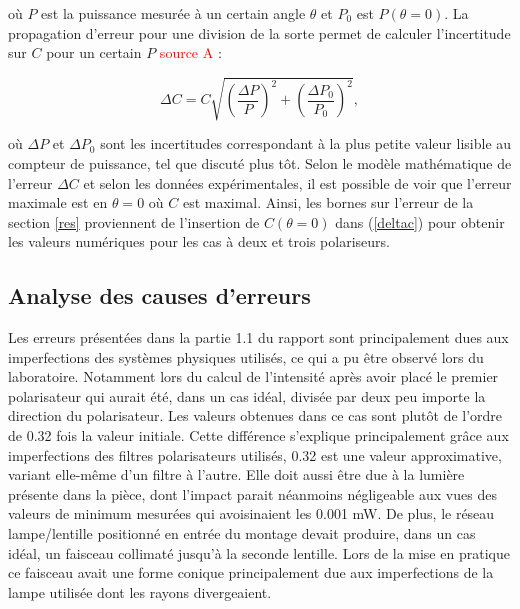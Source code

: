 \documentclass[11pt,letterpaper]{article}
\begin{document}
où $P$ est la puissance mesurée à un certain angle $\theta$ et $P_{0}$ est $P\left( \theta= 0 \right)$.
La propagation d'erreur pour une division de la sorte permet de calculer l'incertitude sur $C$ pour un
certain $P$ \textcolor{red}{source A} :

\begin{equation}\label{deltac}
  \Delta C = C\sqrt{\left( \frac{\Delta P}{P} \right)^{2} + \left( \frac{\Delta P_{0}}{P_{0}} \right)^{2}},
\end{equation}

où $\Delta P$ et $\Delta P_{0}$ sont les incertitudes correspondant à la plus petite valeur lisible au
compteur de puissance, tel que discuté plus tôt. Selon le modèle mathématique de 
l'erreur $\Delta C$ et selon les données expérimentales, il est possible de voir que l'erreur maximale 
est en $\theta= 0$ où $C$ est maximal. Ainsi, les bornes sur l'erreur de la section \ref{res} proviennent
de l'insertion de $C\left( \theta= 0 \right)$ dans (\ref{deltac}) pour obtenir les valeurs numériques pour
les cas à deux et trois polariseurs.



\subsection{Analyse des causes d'erreurs}

 Les erreurs présentées dans la partie 1.1 du rapport sont principalement dues aux imperfections des systèmes physiques utilisés, ce qui a pu être observé lors du laboratoire. Notamment lors du calcul de l'intensité après avoir placé le premier polarisateur qui aurait été, dans un cas idéal, divisée par deux peu importe la direction du polarisateur. Les valeurs obtenues dans ce cas sont plutôt de l'ordre de 0.32 fois la valeur initiale. Cette différence s'explique principalement grâce aux imperfections des filtres polarisateurs utilisés, 0.32 est une valeur approximative, variant elle-même d'un filtre à l'autre. Elle doit aussi être due à la lumière présente dans la pièce, dont l'impact parait néanmoins négligeable aux vues des valeurs de minimum mesurées qui avoisinaient les 0.001 mW. De plus, le réseau lampe/lentille positionné en entrée du montage devait produire, dans un cas idéal, un faisceau collimaté jusqu'à la seconde lentille. Lors de la mise en pratique ce faisceau avait une forme conique principalement due aux imperfections de la lampe utilisée dont les rayons divergeaient.
\end{document}
